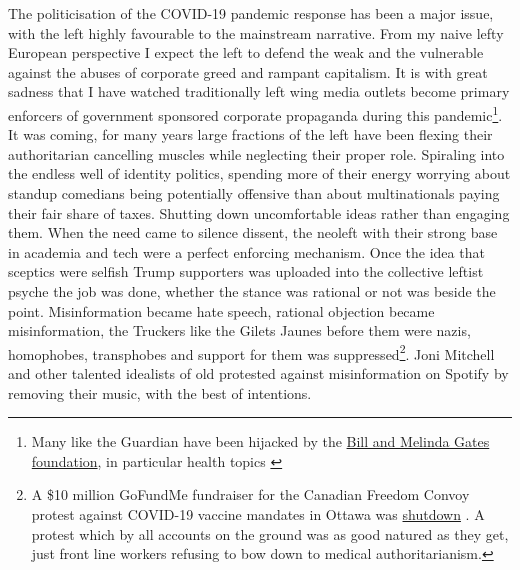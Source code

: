 \documentclass[11pt,a4paper,notitlepage]{report}
\begin{document}
The politicisation of the COVID-19 pandemic response has been a major issue, with the left highly favourable to the mainstream narrative. From my naive lefty European perspective I expect the left to defend the weak and the vulnerable against the abuses of corporate greed and rampant capitalism. It is with great sadness that I have watched traditionally left wing media outlets become primary enforcers of government sponsored corporate propaganda during this pandemic\footnote{Many like the Guardian have been hijacked by the \href{https://www.gatesfoundation.org/about/committed-grants/2020/09/inv017377}{Bill and Melinda Gates foundation}, in particular health topics \cite{bmgf092020}}. It was coming, for many years large fractions of the left have been flexing their authoritarian cancelling muscles while neglecting their proper role. Spiraling into the endless well of identity politics, spending more of their energy worrying about standup comedians being potentially offensive than about multinationals paying their fair share of taxes. Shutting down uncomfortable ideas rather than engaging them. When the need came to silence dissent, the neoleft with their strong base in academia and tech were a perfect enforcing mechanism. Once the idea that sceptics were selfish Trump supporters was uploaded into the collective leftist psyche the job was done, whether the stance was rational or not was beside the point. Misinformation became hate speech, rational objection became misinformation, the Truckers like the Gilets Jaunes before them were nazis, homophobes, transphobes and support for them was suppressed\footnote{A \$10 million GoFundMe fundraiser for the Canadian Freedom Convoy protest against COVID-19 vaccine mandates in Ottawa was \href{https://nypost.com/2022/02/07/gofundmes-10m-shutdown-of-canadian-truckers-shows-its-time-to-rein-in-big-tech/}{shutdown} \cite{newyorkpost07022022}. A protest which by all accounts on the ground was as good natured as they get, just front line workers refusing to bow down to medical authoritarianism.}. Joni Mitchell and other talented idealists of old protested against misinformation on Spotify by removing their music, with the best of intentions. 
\end{document}
